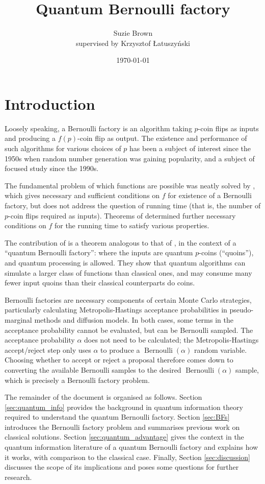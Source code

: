 \documentclass{article}
\title{Quantum Bernoulli factory}
\author{Suzie Brown \\ {\small supervised by Krzysztof \L atuszy\'nski}}
\date{\today}
\theoremstyle{definition}
\newcommand{\Bern}{\operatorname{Bernoulli}}
\begin{document}
\maketitle

\section{Introduction}
Loosely speaking, a Bernoulli factory is an algorithm taking $p$-coin flips as inputs and producing a $f(p)$-coin flip as output.
The existence and performance of such algorithms for various choices of $p$ has been a subject of interest since the 1950s when random number generation was gaining popularity, and a subject of focused study since the 1990s.

The fundamental problem of which functions are possible was neatly solved by \citet{keane1994}, which gives necessary and sufficient conditions on $f$ for existence of a Bernoulli factory, but does not address the question of running time (that is, the number of $p$-coin flips required as inputs).
Theorems of \citet{nacu2005} determined further necessary conditions on $f$ for the running time to satisfy various properties.

The contribution of \citet{dale2015} is a theorem analogous to that of \citet{keane1994}, in the context of a ``quantum Bernoulli factory'': where the inputs are quantum $p$-coins (``quoins''), and quantum processing is allowed.
They show that quantum algorithms can simulate a larger class of functions than classical ones, and may consume many fewer input quoins than their classical counterparts do coins.

Bernoulli factories are necessary components of certain Monte Carlo strategies, particularly calculating Metropolis-Hastings acceptance probabilities in pseudo-marginal methods and diffusion models. 
In both cases, some terms in the acceptance probability cannot be evaluated, but can be Bernoulli sampled. The acceptance probability $\alpha$ does not need to be calculated; the Metropolis-Hastings accept/reject step only uses $\alpha$ to produce a $\Bern(\alpha)$ random variable. Choosing whether to accept or reject a proposal therefore comes down to converting the available Bernoulli samples to the desired $\Bern(\alpha)$ sample, which is precisely a Bernoulli factory problem.

The remainder of the document is organised as follows.
Section \ref{sec:quantum_info} provides the background in quantum information theory required to understand the quantum Bernoulli factory. 
Section \ref{sec:BFs} introduces the Bernoulli factory problem and summarises previous work on classical solutions.
Section \ref{sec:quantum_advantage} gives the context in the quantum information literature of a quantum Bernoulli factory and explains how it works, with comparison to the classical case.
Finally, Section \ref{sec:discussion} discusses the scope of its implications and poses some questions for further research.
\end{document}

